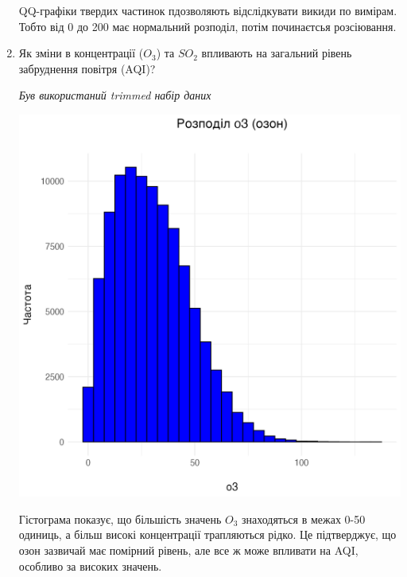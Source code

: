 \documentclass{article}
\begin{document}
\begin{enumerate}
    QQ-графіки твердих частинок пдозволяють відслідкувати викиди по вимірам. Тобто від 0 до 200 має нормальний розподіл, потім починаєтсья розсіювання.
    \item Як зміни в концентрації  ($O_3$)  та $SO_2$ впливають на загальний рівень забруднення повітря (AQI)?
    
    \quad \textit{Був використаний trimmed набір даних}

    \includegraphics[width=6in]{question2/o3_plot.png}
    
    Гістограма показує, що більшість значень $O_3$ знаходяться в межах 0-50 одиниць, а більш високі концентрації трапляються рідко.
    Це підтверджує, що озон зазвичай має помірний рівень, але все ж може впливати на AQI, особливо за високих значень.
    

\end{enumerate}
\end{document}
